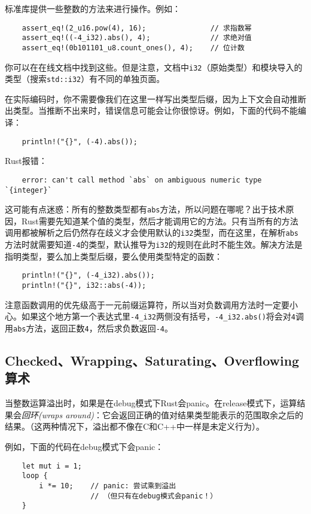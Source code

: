 标准库提供一些整数的方法来进行操作。例如：
\begin{verbatim}
    assert_eq!(2_u16.pow(4), 16);               // 求指数幂
    assert_eq!((-4_i32).abs(), 4);              // 求绝对值
    assert_eq!(0b101101_u8.count_ones(), 4);    // 位计数
\end{verbatim}

你可以在在线文档中找到这些。但是注意，文档中\texttt{i32}（原始类型）和模块导入的类型（搜索\texttt{std::i32}）有不同的单独页面。

在实际编码时，你不需要像我们在这里一样写出类型后缀，因为上下文会自动推断出类型。当推断不出来时，错误信息可能会让你很惊讶。例如，下面的代码不能编译：
\begin{verbatim}
    println!("{}", (-4).abs());
\end{verbatim}

Rust报错：
\begin{verbatim}
    error: can't call method `abs` on ambiguous numeric type `{integer}`
\end{verbatim}

这可能有点迷惑：所有的整数类型都有\texttt{abs}方法，所以问题在哪呢？出于技术原因，Rust需要先知道某个值的类型，然后才能调用它的方法。只有当所有的方法调用都被解析之后仍然存在歧义才会使用默认的\texttt{i32}类型，而在这里，在解析\texttt{abs}方法时就需要知道\texttt{-4}的类型，默认推导为\texttt{i32}的规则在此时不能生效。解决方法是指明类型，要么加上类型后缀，要么使用类型特定的函数：
\begin{verbatim}
    println!("{}", (-4_i32).abs());
    println!("{}", i32::abs(-4));
\end{verbatim}

注意函数调用的优先级高于一元前缀运算符，所以当对负数调用方法时一定要小心。如果这个地方第一个表达式里\texttt{-4\_i32}两侧没有括号，\texttt{-4\_i32.abs()}将会对\texttt{4}调用\texttt{abs}方法，返回正数\texttt{4}，然后求负数返回\texttt{-4}。

\subsection{Checked、Wrapping、Saturating、Overflowing算术}

当整数运算溢出时，如果是在debug模式下Rust会panic。在release模式下，运算结果会\emph{回环(wraps around)}：它会返回正确的值对结果类型能表示的范围取余之后的结果。（这两种情况下，溢出都不像在C和C++中一样是未定义行为）。

例如，下面的代码在debug模式下会panic：
\begin{verbatim}
    let mut i = 1;
    loop {
        i *= 10;    // panic: 尝试乘到溢出
                    // （但只有在debug模式会panic！）
    }
\end{verbatim}


